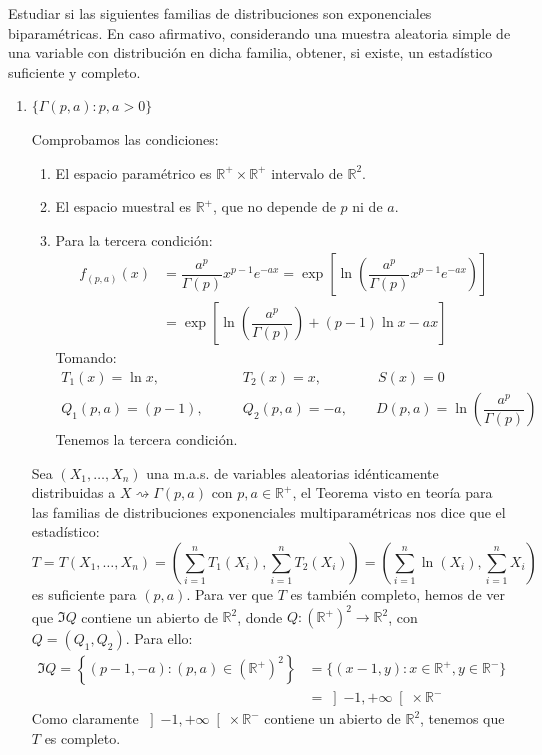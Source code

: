 \begin{ejercicio}
    Estudiar si las siguientes familias de distribuciones son exponenciales biparamétricas.  En caso afirmativo, considerando una muestra aleatoria simple de una variable con distribución en dicha familia, obtener, si existe, un estadístico suficiente y completo.
    \begin{enumerate}[label=\alph*)]
        \item $\{\Gamma(p,a) : p,a>0\}$

            Comprobamos las condiciones:
            \begin{enumerate}[label=\arabic*.]
                \item El espacio paramétrico es $\mathbb{R}^+\times \mathbb{R}^+$ intervalo de $\mathbb{R}^2$.
                \item El espacio muestral es $\mathbb{R}^+$, que no depende de $p$ ni de $a$.
                \item Para la tercera condición:
                    \begin{align*}
                        f_{(p,a)}(x) &= \dfrac{a^p}{\Gamma(p)} x^{p-1}e^{-ax} = \exp\left[\ln\left(\dfrac{a^p}{\Gamma(p)} x^{p-1}e^{-ax} \right)\right] \\ &= \exp\left[\ln\left(\dfrac{a^p}{\Gamma(p)}\right) + (p-1)\ln x - ax\right]
                    \end{align*}
                Tomando:
                \begin{align*}
                    T_1(x) = \ln x, &\qquad  T_2(x) = x, \qquad \qquad   S(x) = 0 \\
                    Q_1(p,a) = (p-1), &\qquad Q_2(p,a) = -a, \qquad D(p,a) = \ln\left(\dfrac{a^p}{\Gamma(p)}\right) 
                \end{align*}
                Tenemos la tercera condición.
            \end{enumerate}
            Sea $(X_1, \ldots, X_n)$ una m.a.s. de variables aleatorias idénticamente distribuidas a $X\rightsquigarrow \Gamma(p,a)$ con $p,a\in \mathbb{R}^+$, el Teorema visto en teoría para las familias de distribuciones exponenciales multiparamétricas nos dice que el estadístico:
            \begin{equation*}
                T = T(X_1, \ldots, X_n) = \left(\sum_{i=1}^{n}T_1(X_i), \sum_{i=1}^{n}T_2(X_i)\right) = \left(\sum_{i=1}^{n}\ln(X_i), \sum_{i=1}^{n}X_i\right)
            \end{equation*}
            es suficiente para $(p,a)$. Para ver que $T$ es también completo, hemos de ver que $\Im Q$ contiene un abierto de $\mathbb{R}^2$, donde $Q:{(\mathbb{R}^+)}^{2}\to \mathbb{R}^2$, con $Q=(Q_1,Q_2)$. Para ello:
            \begin{align*}
                \Im Q = \left\{(p-1,-a) : (p,a)\in {(\mathbb{R}^+)}^{2}\right\} &= \{(x-1,y) : x\in \mathbb{R}^+, y\in \mathbb{R}^-\} \\ &= \left]-1,+\infty\right[\times \mathbb{R}^-
            \end{align*}
            Como claramente $\left]-1,+\infty\right[\times\mathbb{R}^-$ contiene un abierto de $\mathbb{R}^2$, tenemos que $T$ es completo.


\end{enumerate}
\end{ejercicio}

